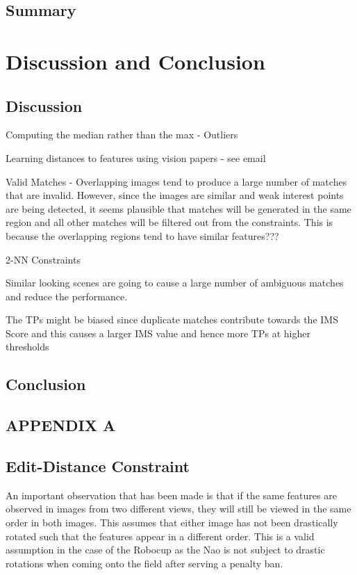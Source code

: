 \documentclass[11pt]{report}
\begin{document}
\section{Summary}
\label{sec:summary}

\chapter{Discussion and Conclusion}
\label{sec:discussionConclusion}

\section{Discussion}
\label{sec:discussion}
Computing the median rather than the max - Outliers

Learning distances to features using vision papers - see email

Valid Matches - Overlapping images tend to produce a large number of matches that are invalid. However, since the images are similar and weak interest points are being detected, it seems plausible that matches will be generated in the same region and all other matches will be filtered out from the constraints. This is because the overlapping regions tend to have similar features???

2-NN Constraints

Similar looking scenes are going to cause a large number of ambiguous matches and reduce the performance.

The TPs might be biased since duplicate matches contribute towards the IMS Score and this causes a larger IMS value and hence more TPs at higher thresholds

\section{Conclusion}
\label{sec:conclusion}



 \newpage
\onecolumn
\appendix
\setcounter{table}{0}
\setcounter{figure}{0}
\setcounter{subsection}{0}
\makeatletter \renewcommand{\thefigure}{A.\@arabic\c@figure} \renewcommand{\thetable}{A.\@arabic\c@table} \renewcommand{\thesection}{A.\@arabic\c@section} \makeatother
\section*{APPENDIX A}

\section{Edit-Distance Constraint}
\label{app:editDistance}
An important observation that has been made is that if the same features are observed in images from two different views, they will still be viewed in the same order in both images. This assumes that either image has not been drastically rotated such that the features appear in a different order. This is a valid assumption in the case of the Robocup as the Nao is not subject to drastic rotations when coming onto the field after serving a penalty ban.\\
\end{document}
